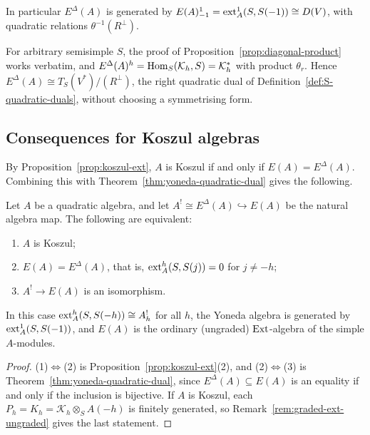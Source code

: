 In particular $E^\Delta(A)$ is generated by $E(A)^1_{-1}=\operatorname{ext}\nolimits^1_A(S,S(-1))\cong D(V)$, with quadratic relations $\theta^{-1}(R^\perp)$.

\begin{advanced}
\begin{remark}[General $S$]
For arbitrary semisimple $S$, the proof of Proposition~\ref{prop:diagonal-product} works verbatim, and $E^\Delta(A)^h=\operatorname{Hom}\nolimits_S(\mathcal K_h,S)=\mathcal K_h^*$ with product $\theta_r$.
Hence $E^\Delta(A)\cong T_S(V^*)/(R^\perp)$, the right quadratic dual of Definition~\ref{def:S-quadratic-duals}, without choosing a symmetrising form.
\end{remark}
\end{advanced}

\subsection{Consequences for Koszul algebras}

By Proposition~\ref{prop:koszul-ext}, $A$ is Koszul if and only if $E(A)=E^\Delta(A)$.
Combining this with Theorem~\ref{thm:yoneda-quadratic-dual} gives the following.

\begin{corollary}\label{cor:yoneda-koszul}
Let $A$ be a quadratic algebra, and let $A^!\cong E^\Delta(A)\hookrightarrow E(A)$ be the natural algebra map.
The following are equivalent:
\begin{enumerate}
\item $A$ is Koszul;
\item $E(A)=E^\Delta(A)$, that is, $\operatorname{ext}\nolimits_A^h(S,S(j))=0$ for $j\neq-h$;
\item $A^!\to E(A)$ is an isomorphism.
\end{enumerate}
In this case $\operatorname{ext}\nolimits_A^h(S,S(-h))\cong A^!_h$ for all $h$, the Yoneda algebra is generated by $\operatorname{ext}\nolimits_A^1(S,S(-1))$, and $E(A)$ is the ordinary (ungraded) $\operatorname{Ext}\nolimits$-algebra of the simple $A$-modules.
\end{corollary}

\begin{proof}
(1)$\Leftrightarrow$(2) is Proposition~\ref{prop:koszul-ext}(2), and (2)$\Leftrightarrow$(3) is Theorem~\ref{thm:yoneda-quadratic-dual}, since $E^\Delta(A)\subseteq E(A)$ is an equality if and only if the inclusion is bijective.
If $A$ is Koszul, each $P_h=K_h=\mathcal K_h\otimes_SA(-h)$ is finitely generated, so Remark~\ref{rem:graded-ext-ungraded} gives the last statement.
\end{proof}

